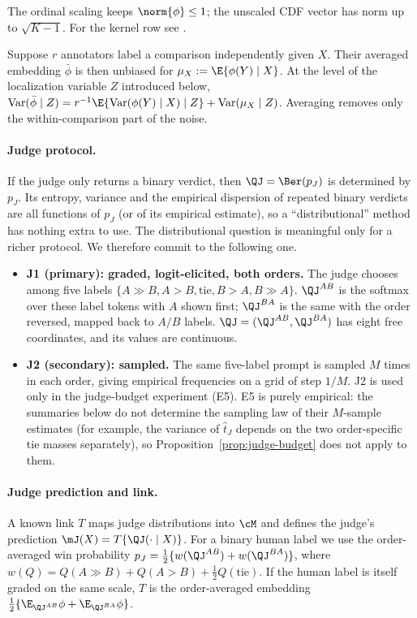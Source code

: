 \noindent The ordinal scaling keeps $\norm{\phi}\le1$; the unscaled CDF vector has norm up to $\sqrt{K-1}$. For the kernel row see \citet{song2009hilbert,muandet2017kernel}.

Suppose $r$ annotators label a comparison independently given $X$. Their averaged embedding
$\bar\phi$ is then unbiased for $\mu_X:=\E\{\phi(Y)\mid X\}$. At the level of the localization
variable $Z$ introduced below,
$\mathrm{Var}(\bar\phi\mid Z)=r^{-1}\E\{\mathrm{Var}(\phi(Y)\mid X)\mid Z\}+\mathrm{Var}(\mu_X\mid Z)$.
Averaging removes only the within-comparison part of the noise.

\paragraph{Judge protocol.}
If the judge only returns a binary verdict, then $\QJ=\Ber(p_J)$ is determined by $p_J$. Its entropy,
variance and the empirical dispersion of repeated binary verdicts are all functions of $p_J$ (or of
its empirical estimate), so a ``distributional'' method has nothing extra to use. The distributional
question is meaningful only for a richer protocol. We therefore commit to the following one.
\begin{itemize}
  \item \textbf{J1 (primary): graded, logit-elicited, both orders.} The judge chooses among five
        labels $\{A\gg B, A>B, \text{tie}, B>A, B\gg A\}$. $\QJ^{AB}$ is the softmax over these
        label tokens with $A$ shown first; $\QJ^{BA}$ is the same with the order reversed, mapped
        back to $A/B$ labels. $\QJ=(\QJ^{AB},\QJ^{BA})$ has eight free coordinates, and its values
        are continuous.
  \item \textbf{J2 (secondary): sampled.} The same five-label prompt is sampled $M$ times in each
        order, giving empirical frequencies on a grid of step $1/M$. J2 is used only in the
        judge-budget experiment (E5). E5 is purely empirical: the summaries below do not determine
        the sampling law of their $M$-sample estimates (for example, the variance of $\hat t_J$
        depends on the two order-specific tie masses separately), so
        Proposition~\ref{prop:judge-budget} does not apply to them.
\end{itemize}

\paragraph{Judge prediction and link.}
A known link $T$ maps judge distributions into $\cM$ and defines the judge's prediction
$\mJ(X)=T\{\QJ(\cdot\mid X)\}$. For a binary human label we use the order-averaged win probability
$p_J=\tfrac12\{w(\QJ^{AB})+w(\QJ^{BA})\}$, where $w(Q)=Q(A\gg B)+Q(A>B)+\tfrac12Q(\text{tie})$. If the
human label is itself graded on the same scale, $T$ is the order-averaged embedding
$\tfrac12\{\E_{\QJ^{AB}}\phi+\E_{\QJ^{BA}}\phi\}$.


